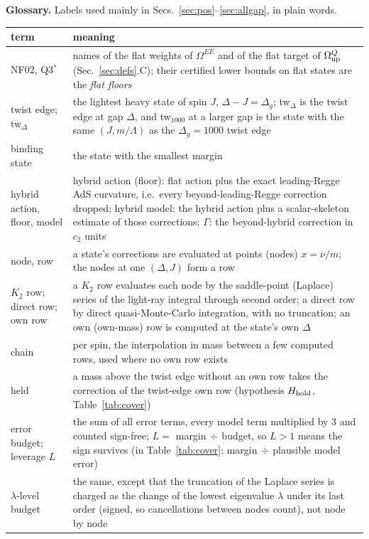 \documentclass[aps,prl,onecolumn,superscriptaddress,nofootinbib]{revtex4-2}
\begin{document}
\textbf{Glossary.} Labels used mainly in Secs.~\ref{sec:pos}--\ref{sec:allgap}, in plain words.
\begin{center}\footnotesize
\begin{tabular}{@{}L{2.9cm}L{13.4cm}@{}}
\toprule
term & meaning\\\midrule
NF02, Q3$^*$ & names of the flat weights of $\Omega^{EE}$ and of the flat target of $\Omega^Q_{\rm up}$ (Sec.~\ref{sec:defs}.C); their certified lower bounds on flat states are the \emph{flat floors}\\
twist edge; tw$_{\Delta}$ & the lightest heavy state of spin $J$, $\Delta-J=\Delta_g$; tw$_{\Delta}$ is the twist edge at gap $\Delta$, and tw$_{1000}$ at a larger gap is the state with the same $(J,m/\Lambda)$ as the $\Delta_g=1000$ twist edge\\
binding state & the state with the smallest margin\\
hybrid action, floor, model & hybrid action (floor): flat action plus the exact leading-Regge AdS curvature, i.e.\ every beyond-leading-Regge correction dropped; hybrid model: the hybrid action plus a scalar-skeleton estimate of those corrections; $\Gamma$: the beyond-hybrid correction in $c_2$ units\\
node, row & a state's corrections are evaluated at points (nodes) $x=\nu/m$; the nodes at one $(\Delta,J)$ form a row\\
$K_2$ row; direct row; own row & a $K_2$ row evaluates each node by the saddle-point (Laplace) series of the light-ray integral through second order; a direct row by direct quasi-Monte-Carlo integration, with no truncation; an own (own-mass) row is computed at the state's own $\Delta$\\
chain & per spin, the interpolation in mass between a few computed rows, used where no own row exists\\
held & a mass above the twist edge without an own row takes the correction of the twist-edge own row (hypothesis $H_{\rm hold}$, Table~\ref{tab:cover})\\
error budget; leverage $L$ & the sum of all error terms, every model term multiplied by $3$ and counted sign-free; $L=$ margin$\,\div\,$budget, so $L>1$ means the sign survives (in Table~\ref{tab:cover}: margin$\,\div\,$plausible model error)\\
$\lambda$-level budget & the same, except that the truncation of the Laplace series is charged as the change of the lowest eigenvalue $\lambda$ under its last order (signed, so cancellations between nodes count), not node by node\\

\end{tabular}
\end{center}
\end{document}
